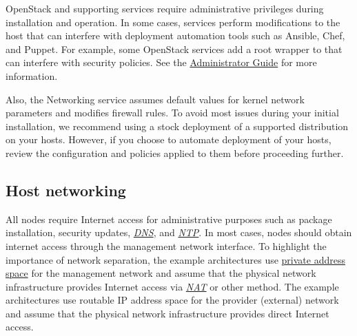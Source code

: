 \documentclass[letterpaper,10pt,english]{sphinxmanual}
\begin{document}
OpenStack and supporting services require administrative privileges
during installation and operation. In some cases, services perform
modifications to the host that can interfere with deployment automation
tools such as Ansible, Chef, and Puppet. For example, some OpenStack
services add a root wrapper to  that can interfere with security
policies. See the \href{http://docs.openstack.org/admin-guide/compute-root-wrap-reference.html}{Administrator Guide}
for more information.

Also, the Networking service assumes default values for kernel network
parameters and modifies firewall rules. To avoid most issues during your
initial installation, we recommend using a stock deployment of a supported
distribution on your hosts. However, if you choose to automate deployment
of your hosts, review the configuration and policies applied to them before
proceeding further.


\subsection{Host networking}
\label{_source/installation_guide/environment-networking:environment-networking}\label{_source/installation_guide/environment-networking::doc}\label{_source/installation_guide/environment-networking:host-networking}
All nodes require Internet access for administrative purposes such as package
installation, security updates, {\hyperref[_source/glossary:term-dns]{\emph{DNS}}}, and {\hyperref[_source/glossary:term-ntp]{\emph{NTP}}}. In most cases,
nodes should obtain internet access through the management network interface.
To highlight the importance of network separation, the example architectures
use \href{https://tools.ietf.org/html/rfc1918}{private address space} for the
management network and assume that the physical network infrastructure
provides Internet access via {\hyperref[_source/glossary:term-nat]{\emph{NAT}}} or other method. The example
architectures use routable IP address space for the provider (external)
network and assume that the physical network infrastructure provides direct
Internet access.
\end{document}
